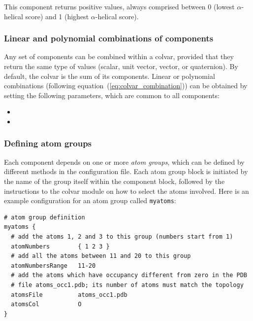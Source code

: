 This component returns positive values, always comprised between 0
(lowest $\alpha$-helical score) and 1 (highest $\alpha$-helical
score).



\subsubsection*{Linear and polynomial combinations of components}
Any set of components can be combined within a colvar,
provided that they return
the same type of values (scalar, unit vector, vector, or quaternion).
By default, the colvar is the sum of its components.
Linear or polynomial combinations (following equation~(\ref{eq:colvar_combination}))
can be obtained by setting the following
parameters, which are common to all components:
\begin{itemize}

\item %

\item %

\end{itemize}


\subsubsection*{Defining atom groups}
\label{sec:colvar_atom_groups}
Each component depends on one
or more \emph{atom groups}, which can be defined by different methods
in the configuration file.  Each atom group block is
initiated by the name of the group itself within the component block,
followed by the instructions to the colvar module on how to select the
atoms involved.  Here is an example configuration for an atom group called
\texttt{myatoms}:
\begin{verbatim}
# atom group definition
myatoms {
  # add the atoms 1, 2 and 3 to this group (numbers start from 1)
  atomNumbers        { 1 2 3 }
  # add all the atoms between 11 and 20 to this group
  atomNumbersRange   11-20
  # add the atoms which have occupancy different from zero in the PDB
  # file atoms_occ1.pdb; its number of atoms must match the topology
  atomsFile          atoms_occ1.pdb
  atomsCol           O
}
\end{verbatim}

